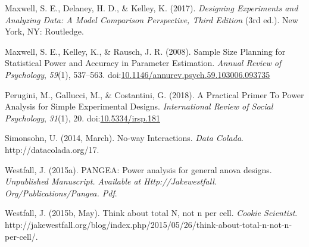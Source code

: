 \documentclass[,man,floatsintext]{apa6}
\begin{document}
\leavevmode\hypertarget{ref-maxwell_designing_2017}{}%
Maxwell, S. E., Delaney, H. D., \& Kelley, K. (2017). \emph{Designing Experiments and Analyzing Data: A Model Comparison Perspective, Third Edition} (3rd ed.). New York, NY: Routledge.

\leavevmode\hypertarget{ref-maxwell_sample_2008}{}%
Maxwell, S. E., Kelley, K., \& Rausch, J. R. (2008). Sample Size Planning for Statistical Power and Accuracy in Parameter Estimation. \emph{Annual Review of Psychology}, \emph{59}(1), 537--563. doi:\href{https://doi.org/10.1146/annurev.psych.59.103006.093735}{10.1146/annurev.psych.59.103006.093735}

\leavevmode\hypertarget{ref-perugini_practical_2018}{}%
Perugini, M., Gallucci, M., \& Costantini, G. (2018). A Practical Primer To Power Analysis for Simple Experimental Designs. \emph{International Review of Social Psychology}, \emph{31}(1), 20. doi:\href{https://doi.org/10.5334/irsp.181}{10.5334/irsp.181}

\leavevmode\hypertarget{ref-simonsohn_no-way_2014}{}%
Simonsohn, U. (2014, March). No-way Interactions. \emph{Data Colada}. http://datacolada.org/17.

\leavevmode\hypertarget{ref-westfall2015pangea}{}%
Westfall, J. (2015a). PANGEA: Power analysis for general anova designs. \emph{Unpublished Manuscript. Available at Http://Jakewestfall. Org/Publications/Pangea. Pdf}.

\leavevmode\hypertarget{ref-westfall_think_2015}{}%
Westfall, J. (2015b, May). Think about total N, not n per cell. \emph{Cookie Scientist}. http://jakewestfall.org/blog/index.php/2015/05/26/think-about-total-n-not-n-per-cell/.
\end{document}
